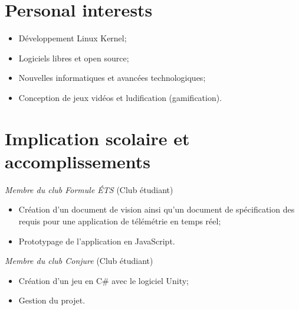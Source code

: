 \documentclass{res}
\newcommand{\inFrench}[1]{#1}
\newcommand{\inEnglish}[1]{}
\begin{document}
\begin{resume}
{	\section{Personal interests}
}
\vspace{6pt}

\inFrench{
	\vspace{6pt}
	\begin{itemize} \itemsep -2pt
		\item Développement Linux Kernel;
		\item Logiciels libres et open source;
		\item Nouvelles informatiques et avancées technologiques;
		\item Conception de jeux vidéos et ludification (gamification).
	\end{itemize}
}

\inEnglish{
	\vspace{6pt}
	\begin{itemize} \itemsep -2pt
		\item Linux Kernel development.
		\item Free software and open source.
		\item Computer science news and advances.
		\item Game design and gamification.
	\end{itemize}
}

\inFrench{
	\section{Implication scolaire et accomplissements}
}
\inEnglish{
	\section{Scholar involvement and accomplishment}
}
\vspace{6pt}

\inFrench{
	{\sl Membre du club Formule ÉTS} \hfill (Club étudiant)
	\vspace{0.05in}
	\begin{itemize} \itemsep -2pt
		\item Création d’un document de vision ainsi qu’un document de spécification des requis pour une application de télémétrie en temps réel;
		\item Prototypage de l’application en JavaScript.
	\end{itemize}

	{\sl Membre du club Conjure} \hfill (Club étudiant)
	\vspace{0.05in}
	\begin{itemize} \itemsep -2pt
		\item Création d’un jeu en C\# avec le logiciel Unity;
		\item Gestion du projet.
	\end{itemize}

}
\end{resume}
\end{document}
